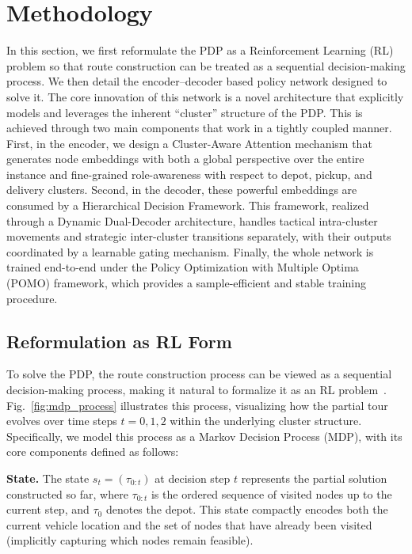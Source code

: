 \documentclass[pdflatex,sn-basic,Numbered]{sn-jnl}
\begin{document}

\section{Methodology}\label{sec:methodology}
In this section, we first reformulate the PDP as a Reinforcement Learning (RL) problem so that route construction can be treated as a sequential decision-making process. We then detail the encoder--decoder based policy network designed to solve it. The core innovation of this network is a novel architecture that explicitly models and leverages the inherent ``cluster'' structure of the PDP. This is achieved through two main components that work in a tightly coupled manner. First, in the encoder, we design a Cluster-Aware Attention mechanism that generates node embeddings with both a global perspective over the entire instance and fine-grained role-awareness with respect to depot, pickup, and delivery clusters. Second, in the decoder, these powerful embeddings are consumed by a Hierarchical Decision Framework. This framework, realized through a Dynamic Dual-Decoder architecture, handles tactical intra-cluster movements and strategic inter-cluster transitions separately, with their outputs coordinated by a learnable gating mechanism. Finally, the whole network is trained end-to-end under the Policy Optimization with Multiple Optima (POMO) framework, which provides a sample-efficient and stable training procedure.

\subsection{Reformulation as RL Form}
To solve the PDP, the route construction process can be viewed as a sequential decision-making process, making it natural to formalize it as an RL problem~\cite{bello2016nco,nazari2018rl4vrp,kool2019attention}. Fig.~\ref{fig:mdp_process} illustrates this process, visualizing how the partial tour evolves over time steps $t=0, 1, 2$ within the underlying cluster structure. Specifically, we model this process as a Markov Decision Process (MDP), with its core components defined as follows:

\textbf{State.} The state $s_t = (\tau_{0:t})$ at decision step $t$ represents the partial solution constructed so far, where $\tau_{0:t}$ is the ordered sequence of visited nodes up to the current step, and $\tau_0$ denotes the depot. This state compactly encodes both the current vehicle location and the set of nodes that have already been visited (implicitly capturing which nodes remain feasible).
\end{document}
